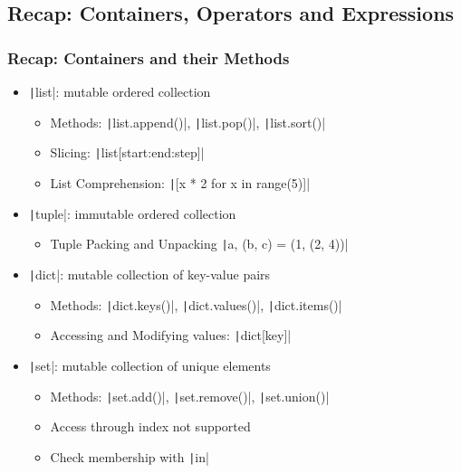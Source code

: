 \documentclass{beamer}
\newcommand{\python}[1]{\texttt|#1|}
\begin{document}
\subsection{Recap: Containers, Operators and Expressions}
\begin{frame}
    \frametitle{Recap: Containers and their Methods}
    \begin{itemize}
        \item \python{list}: mutable ordered collection
              \begin{itemize}
                  \item Methods: \python{list.append()}, \python{list.pop()}, \python{list.sort()}
                  \item Slicing: \python{list[start:end:step]}
                  \item List Comprehension: \python{[x * 2 for x in range(5)]}
              \end{itemize}
        \item \python{tuple}: immutable ordered collection
              \begin{itemize}
                  \item Tuple Packing and Unpacking \python{a, (b, c) = (1, (2, 4))}
              \end{itemize}
        \item \python{dict}: mutable collection of key-value pairs
              \begin{itemize}
                  \item Methods: \python{dict.keys()}, \python{dict.values()}, \python{dict.items()}
                  \item Accessing and Modifying values: \python{dict[key]}
              \end{itemize}
        \item \python{set}: mutable collection of unique elements
              \begin{itemize}
                  \item Methods: \python{set.add()}, \python{set.remove()}, \python{set.union()}
                  \item Access through index not supported
                  \item Check membership with \python{in}
              \end{itemize}
    \end{itemize}
\end{frame}
\end{document}
